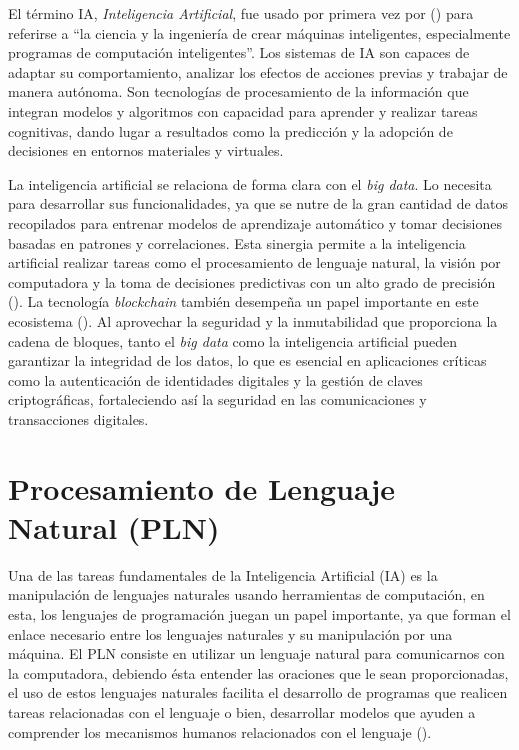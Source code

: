 {{El término IA, \textit{Inteligencia Artificial}, fue usado por primera vez por (\cite{McCarthy_Minsky_Rochester_Shannon_2006}) para referirse a “la ciencia y la ingeniería de crear máquinas inteligentes, especialmente programas de computación inteligentes”. Los sistemas de IA son capaces de adaptar su comportamiento, analizar los efectos de acciones previas y trabajar de manera autónoma. Son tecnologías de procesamiento de la información que integran modelos y algoritmos con capacidad para aprender y realizar tareas cognitivas, dando lugar a resultados como la predicción y la adopción de decisiones en entornos materiales y virtuales.

La inteligencia artificial se relaciona de forma clara con el \textit{big data}. Lo necesita para desarrollar sus funcionalidades, ya que se nutre de la gran cantidad de datos recopilados para entrenar modelos de aprendizaje automático y tomar decisiones basadas en patrones y correlaciones. Esta sinergia permite a la inteligencia artificial realizar tareas como el procesamiento de lenguaje natural, la visión por computadora y la toma de decisiones predictivas con un alto grado de precisión (\cite{cotino2017inteligencia}). La tecnología \textit{blockchain} también desempeña un papel importante en este ecosistema (\cite{merchan2019blockchain}). Al aprovechar la seguridad y la inmutabilidad que proporciona la cadena de bloques, tanto el \textit{big data} como la inteligencia artificial pueden garantizar la integridad de los datos, lo que es esencial en aplicaciones críticas como la autenticación de identidades digitales y la gestión de claves criptográficas, fortaleciendo así la seguridad en las comunicaciones y transacciones digitales.


\section{Procesamiento de Lenguaje Natural (PLN)}
Una de las tareas fundamentales de la Inteligencia Artificial (IA) es la manipulación de lenguajes naturales usando herramientas de computación, en esta, los lenguajes de programación juegan un papel importante, ya que forman el enlace necesario entre los lenguajes naturales y su manipulación por una máquina. El PLN consiste en utilizar un lenguaje natural para comunicarnos con la computadora, debiendo ésta entender las oraciones que le sean proporcionadas, el uso de estos lenguajes naturales facilita el desarrollo de programas que realicen tareas relacionadas con el lenguaje o bien, desarrollar modelos que ayuden a comprender los mecanismos humanos relacionados con el lenguaje (\cite{Vasquez2009PLN}).

}}
